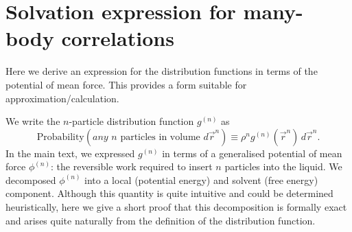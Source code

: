 \documentclass[12pt]{report}
\begin{document}
\section{Solvation expression for many-body correlations}

Here we derive an expression for the distribution functions in terms of the potential of mean force.
This provides a form suitable for approximation/calculation.

We write the $n$-particle distribution function $g^{(n)}$ as
\begin{equation}\label{eq:n-density-pdf}
  \textrm{Probability}\left( \textit{any } n \textrm{ particles in volume } d\vec{r}^n \right)
  \equiv
  \rho^n g^{(n)}(\vec{r}^n) \, d\vec{r}^n.
\end{equation}
In the main text, we expressed $g^{(n)}$ in terms of a generalised potential of mean force $\phi^{(n)}$: the reversible work required to insert $n$ particles into the liquid.
We decomposed $\phi^{(n)}$ into a local (potential energy) and solvent (free energy) component.
Although this quantity is quite intuitive and could be determined heuristically, here we give a short proof that this decomposition is formally exact and arises quite naturally from the definition of the distribution function.
\end{document}
